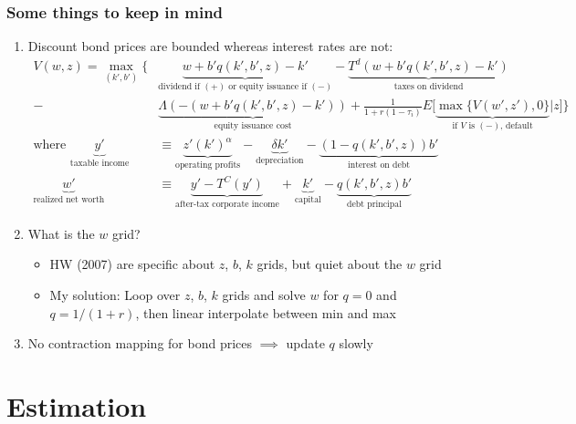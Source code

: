 \documentclass[usenames,dvipsnames, handout]{beamer}
\begin{document}
\begin{frame}
\frametitle{Some things to keep in mind}
\small
\begin{enumerate}
\item Discount bond prices are bounded whereas interest rates are not:
\scriptsize
\begin{align*}
V(w, z) =
\max_{(k', b')} \Bigg\{ 
& \underbrace{w + b'q(k',b',z) - k'}_{\text{dividend if } (+) \text{ or equity issuance if } (-)} - \underbrace{T^d(w + b'q(k',b',z) - k')}_{\text{taxes on dividend}} \\
- &\underbrace{\Lambda(-(w + b'q(k',b',z) - k'))}_{\text{equity issuance cost}} + \frac{1}{1+r(1-\tau_i)} E\Big[\underbrace{\max\{ V(w', z'), 0\}}_{\text{if }V \text{ is } (-) \text{, default}}| z\Big] \Bigg\} \\
\text{where }
\underbrace{y'}_{\text{taxable income}} &\equiv \underbrace{z' (k')^\alpha}_{\text{operating profits}} - \underbrace{\delta k'}_{\text{depreciation}} - \underbrace{(1-q(k',b',z)) b'}_{\text{interest on debt}} \\
\underbrace{w'}_{\text{realized net worth}} &\equiv \underbrace{y' - T^C(y')}_{\text{after-tax corporate income}}+ \underbrace{k'}_{\text{capital}}  - \underbrace{q(k',b',z)b'}_{\text{debt principal}}
\end{align*}
\small
\item What is the $w$ grid?
\begin{itemize}
\item HW (2007) are specific about $z$, $b$, $k$ grids, but quiet about the $w$ grid
\item My solution: Loop over $z$, $b$, $k$ grids and solve $w$ for $q = 0$ and $q = 1/(1+r)$, then linear interpolate between min and max
\end{itemize}
\item No contraction mapping for bond prices $\implies$ update $q$ slowly
\end{enumerate}
\end{frame}

\section{Estimation}

\end{document}
